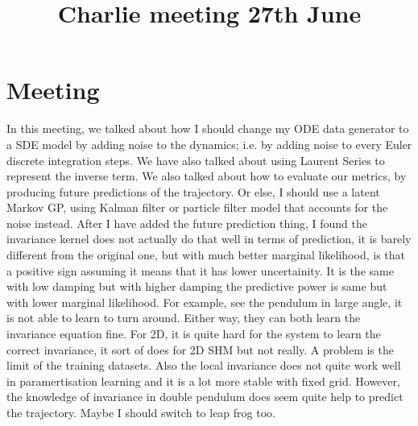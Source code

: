 \documentclass{article}
\title{\vspace{-3cm}Charlie meeting 27th June\vspace{-3em}}
\author{}
\date{}
\begin{document}
\maketitle
\section*{Meeting}
In this meeting, we talked about how I should change my ODE data generator to a SDE model by adding noise to the dynamics; i.e. by adding noise to every Euler discrete integration steps.
We have also talked about using Laurent Series to represent the inverse term.
We also talked about how to evaluate our metrics, by producing future predictions of the trajectory. 
Or else, I should use a latent Markov GP, using Kalman filter or particle filter model that accounts for the noise instead.
After I have added the future prediction thing, I found the invariance kernel does not actually do that well in terms of prediction, it is barely different from the original one, but with much better marginal likelihood, is that a positive sign assuming it means that it has lower uncertainity.
It is the same with low damping but with higher damping the predictive power is same but with lower marginal likelihood.
For example, see the pendulum in large angle, it is not able to learn to turn around.
Either way, they can both learn the invariance equation fine. 
For 2D, it is quite hard for the system to learn the correct invariance, it sort of does for 2D SHM but not really. 
A problem is the limit of the training datasets. 
Also the local invariance does not quite work well in paramertisation learning and it is a lot more stable with fixed grid. 
However, the knowledge of invariance in double pendulum does seem quite help to predict the trajectory.
Maybe I should switch to leap frog too.
\end{document}
